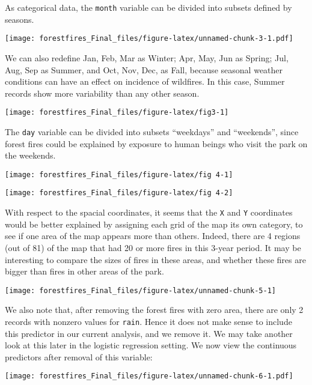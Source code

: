 \documentclass[]{article}
\begin{document}
As categorical data, the \texttt{month} variable can be divided into
subsets defined by seasons.

\texttt{[image: forestfires\_Final\_files/figure-latex/unnamed-chunk-3-1.pdf]}

We can also redefine Jan, Feb, Mar as Winter; Apr, May, Jun as Spring;
Jul, Aug, Sep as Summer, and Oct, Nov, Dec, as Fall, because seasonal
weather conditions can have an effect on incidence of wildfires. In this
case, Summer records show more variability than any other season.

\begin{center}\texttt{[image: forestfires\_Final\_files/figure-latex/fig3-1]} \end{center}

The \texttt{day} variable can be divided into subsets ``weekdays'' and
``weekends'', since forest fires could be explained by exposure to human
beings who visit the park on the weekends.

\begin{center}\texttt{[image: forestfires\_Final\_files/figure-latex/fig 4-1]} \end{center}

\begin{center}\texttt{[image: forestfires\_Final\_files/figure-latex/fig 4-2]} \end{center}

With respect to the spacial coordinates, it seems that the \texttt{X}
and \texttt{Y} coordinates would be better explained by assigning each
grid of the map its own category, to see if one area of the map appears
more than others. Indeed, there are 4 regions (out of 81) of the map
that had 20 or more fires in this 3-year period. It may be interesting
to compare the sizes of fires in these areas, and whether these fires
are bigger than fires in other areas of the park.

\begin{center}\texttt{[image: forestfires\_Final\_files/figure-latex/unnamed-chunk-5-1]} \end{center}

We also note that, after removing the forest fires with zero area, there
are only 2 records with nonzero values for \texttt{rain}. Hence it does
not make sense to include this predictor in our current analysis, and we
remove it. We may take another look at this later in the logistic
regression setting. We now view the continuous predictors after removal
of this variable:

\texttt{[image: forestfires\_Final\_files/figure-latex/unnamed-chunk-6-1.pdf]}
\end{document}
